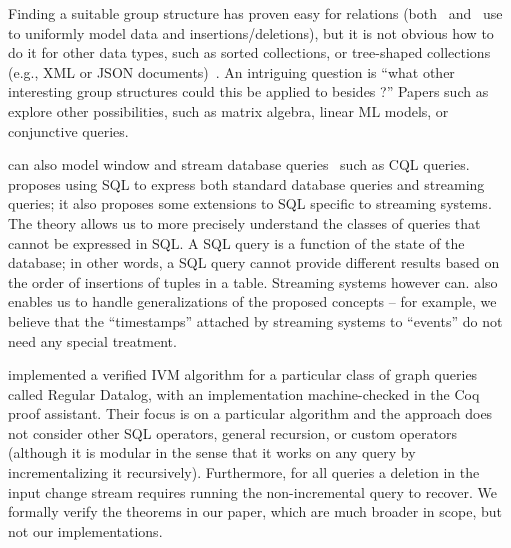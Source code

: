 Finding a suitable group structure has proven easy for relations
(both~\cite{koch-pods10} and~\cite{green-tcs11} use \zrs to uniformly
model data and insertions/deletions), but it is not obvious how to do
it for other data types, such as sorted collections, or tree-shaped
collections (e.g., XML or JSON documents)~\cite{foster-planx08}.  An
intriguing question is ``what other interesting group structures could
this be applied to besides \zrs?''  Papers such
as~\cite{nikolic-icmd18} explore other possibilities, such as matrix
algebra, linear ML models, or conjunctive queries.

\dbsp can also model window and stream database
queries~\cite{arasu-tr02,aurora} such as CQL queries.
\cite{begoli-sigmod19} proposes using SQL to express both standard
database queries and streaming queries; it also proposes some
extensions to SQL specific to streaming systems.  The \dbsp theory
allows us to more precisely understand the classes of queries that
cannot be expressed in SQL.  A SQL query is a function of the state of
the database; in other words, a SQL query cannot provide different
results based on the order of insertions of tuples in a table.
Streaming systems however can.  \dbsp also enables us to handle
generalizations of the proposed concepts -- for example, we believe
that the ``timestamps'' attached by streaming systems to ``events'' do
not need any special treatment.

\cite{bonifati-iclp2018} implemented a verified IVM algorithm for a
particular class of graph queries called Regular Datalog, with an
implementation machine-checked in the Coq proof assistant. Their focus
is on a particular algorithm and the approach does not consider other
SQL operators, general recursion, or custom operators (although it is
modular in the sense that it works on any query by incrementalizing it
recursively). Furthermore, for all queries a deletion in the input
change stream requires running the non-incremental query to recover.
We formally verify the theorems in our paper, which are much broader
in scope, but not our implementations.


